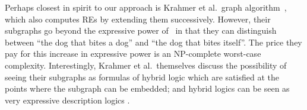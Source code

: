 Perhaps closest in spirit to our approach is Krahmer et al.\ graph
algorithm~, which also computes REs by
extending them successively.  However, their subgraphs go beyond the
expressive power of \alc\ in that they can distinguish between ``the
dog that bites a dog'' and ``the dog that bites itself''.  The price
they pay for this increase in expressive power is an NP-complete
worst-case complexity.  Interestingly, Krahmer et al.\ themselves
discuss the possibility of seeing their subgraphs as formulas of
hybrid logic which are satisfied at the points where the subgraph can
be embedded; and hybrid logics can be seen as very expressive
description logics \cite{arec:hybr05b}.











